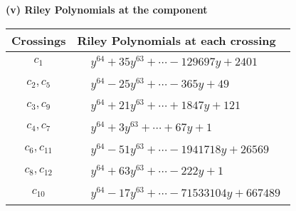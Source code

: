 \documentclass[1p]{elsarticle_modified}
\theoremstyle{definition}
\begin{document}
\flushleft \textbf{(v) Riley Polynomials at the component}\newline \\
\begin{tabular}{m{50pt}|m{274pt}}
Crossings & \hspace{64pt}Riley Polynomials at each crossing \\
\hline $$\begin{aligned}c_{1}\end{aligned}$$&$\begin{aligned}
&y^{64}+35 y^{63}+\cdots-129697 y+2401
\end{aligned}$\\
\hline $$\begin{aligned}c_{2},c_{5}\end{aligned}$$&$\begin{aligned}
&y^{64}-25 y^{63}+\cdots-365 y+49
\end{aligned}$\\
\hline $$\begin{aligned}c_{3},c_{9}\end{aligned}$$&$\begin{aligned}
&y^{64}+21 y^{63}+\cdots+1847 y+121
\end{aligned}$\\
\hline $$\begin{aligned}c_{4},c_{7}\end{aligned}$$&$\begin{aligned}
&y^{64}+3 y^{63}+\cdots+67 y+1
\end{aligned}$\\
\hline $$\begin{aligned}c_{6},c_{11}\end{aligned}$$&$\begin{aligned}
&y^{64}-51 y^{63}+\cdots-1941718 y+26569
\end{aligned}$\\
\hline $$\begin{aligned}c_{8},c_{12}\end{aligned}$$&$\begin{aligned}
&y^{64}+63 y^{63}+\cdots-222 y+1
\end{aligned}$\\
\hline $$\begin{aligned}c_{10}\end{aligned}$$&$\begin{aligned}
&y^{64}-17 y^{63}+\cdots-71533104 y+667489
\end{aligned}$\\
\hline
\end{tabular}\\~\\
\end{document}
